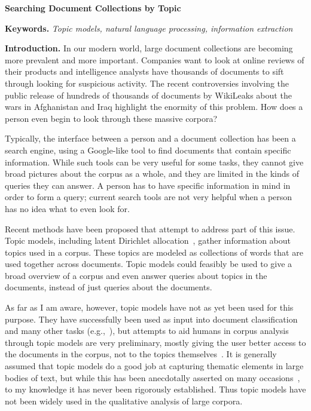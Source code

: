 \documentclass[onecolumn, 12pt]{article}
\begin{document}
\pagestyle{empty}

\begin{center}
  \textbf{Searching Document Collections by Topic}
\end{center}
\vspace{-4mm}

\textbf{Keywords.} \textit{Topic models, natural language processing,
information extraction}

\textbf{Introduction.}  In our modern world, large document collections are
becoming more prevalent and more important.  Companies want to look at online
reviews of their products and intelligence analysts have thousands of documents
to sift through looking for suspicious activity.  The recent controversies
involving the public release of hundreds of thousands of documents by WikiLeaks
about the wars in Afghanistan and Iraq highlight the enormity of this problem.
How does a person even begin to look through these massive corpora?

Typically, the interface between a person and a document collection has been a
search engine, using a Google-like tool to find documents that contain specific
information.  While such tools can be very useful for some tasks, they cannot
give broad pictures about the corpus as a whole, and they are limited in the
kinds of queries they can answer.  A person has to have specific information in
mind in order to form a query; current search tools are not very helpful when a
person has no idea what to even look for.

Recent methods have been proposed that attempt to address part of this issue.
Topic models, including latent Dirichlet
allocation~\cite{blei-2003-latent-dirichlet-allocation}, gather information
about topics used in a corpus.  These topics are modeled as collections of
words that are used together across documents.  Topic models could feasibly be
used to give a broad overview of a corpus and even answer queries about topics
in the documents, instead of just queries about the documents.

As far as I am aware, however, topic models have not as yet been used for this
purpose.  They have successfully been used as input into document
classification and many other tasks
(e.g.,~\cite{blei-2008-supervised-topic-models}), but attempts to aid humans in
corpus analysis through topic models are very preliminary, mostly giving the
user better access to the documents in the corpus, not to the topics
themselves~\cite{newman-2010-visualizing-with-topic-maps}.  It is generally
assumed that topic models do a good job at capturing thematic elements in large
bodies of text, but while this has been anecdotally asserted on many
occasions~\cite{griffiths-2004-finding-scientific-topics}, to my knowledge it
has never been rigorously established.  Thus topic models have not been widely
used in the qualitative analysis of large corpora.
\end{document}
